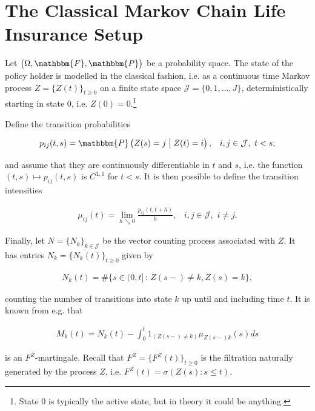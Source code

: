 \documentclass{book}
\newcommand{\1}[1]{\mathbbm{1}_{\left\lbrace #1 \right\rbrace}}
\theoremstyle{break}
\theoremstyle{remark}
\numberwithin{equation}{section}
\begin{document}
\section{The Classical Markov Chain Life Insurance Setup}

Let $\left( \Omega, \mathbbm{F}, \mathbbm{P} \right)$ be a probability space. The state of the policy holder is modelled in the classical fashion, i.e. as a continuous time Markov process $Z = \{ Z(t) \}_{t \geq 0}$ on a finite state space $\mathcal{J}= \{ 0, 1, ..., J \} $, deterministically starting in state $0$, i.e. $Z(0) = 0$.\footnote{State 0 is typically the active state, but in theory it could be anything.}

Define the transition probabilities

\begin{align*}
    p_{ij}(t,s) =  \mathbbm{P} \left( Z(s)=j \;\middle\vert\; Z(t)=i \right), \, \, \, \, \, i,j \in \mathcal{J}, \, \, t < s,
\end{align*}

and assume that they are continuously differentiable in $t$ and $s$, i.e. the function $(t,s) \mapsto p_{ij}(t,s)$ is $C^{1,1}$ for $t < s$. It is then possible to define the transition intensities

\begin{align*}
    \mu_{ij}(t) = \lim_{h \searrow 0} \frac{p_{ij} \left( t,t+h \right)}{h}, \, \, \, \, \, i,j \in \mathcal{J}, \, \, i \neq j.
\end{align*}

Finally, let $N = \{ N_{k} \}_{k \in \mathcal{J}}$ be the vector counting process associated with $Z$. It has entries $N_{k} = \{ N_{k}(t) \}_{t \geq 0}$ given by

\begin{align*}
    N_{k}(t) = \# \{ s \in (0,t] \, : \, Z(s-) \neq k, Z(s)=k \},
\end{align*}

counting the number of transitions into state $k$ up until and including time $t$. It is known from e.g. \cite{LivStok} that

\begin{align*}
    M_{k}(t) = N_{k}(t) - \int_0^t 1_{( Z(s-) \neq k)} \mu_{Z(s-)k}(s)ds
\end{align*}

is an $F^Z$-martingale. Recall that $F^Z= \{ F^Z(t) \}_{t \geq 0}$ is the filtration naturally generated by the process $Z$, i.e. $F^Z(t) = \sigma(Z(s) : s \leq t)$.
\end{document}

